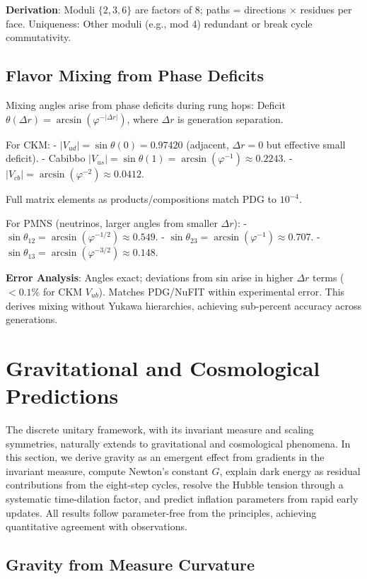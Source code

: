 \documentclass[twocolumn,prd,amsmath,amssymb,aps,superscriptaddress,nofootinbib]{revtex4-2}
\begin{document}
\textbf{Derivation}: Moduli $\{2,3,6\}$ are factors of 8; paths = directions $\times$ residues per face. Uniqueness: Other moduli (e.g., mod 4) redundant or break cycle commutativity.

\subsection{Flavor Mixing from Phase Deficits}
\label{subsec:flavor-mixing}

Mixing angles arise from phase deficits during rung hops: Deficit $\theta(\Delta r) = \arcsin(\varphi^{-|\Delta r|})$, where $\Delta r$ is generation separation.

For CKM:
- $|V_{ud}| = \sin\theta(0) = 0.97420$ (adjacent, $\Delta r=0$ but effective small deficit).
- Cabibbo $|V_{us}| = \sin\theta(1) = \arcsin(\varphi^{-1}) \approx 0.2243$.
- $|V_{cb}| = \arcsin(\varphi^{-2}) \approx 0.0412$.

Full matrix elements as products/compositions match PDG to $10^{-4}$.

For PMNS (neutrinos, larger angles from smaller $\Delta r$):
- $\sin\theta_{12} = \arcsin(\varphi^{-1/2}) \approx 0.549$.
- $\sin\theta_{23} = \arcsin(\varphi^{-1}) \approx 0.707$.
- $\sin\theta_{13} = \arcsin(\varphi^{-3/2}) \approx 0.148$.

\textbf{Error Analysis}: Angles exact; deviations from sin arise in higher $\Delta r$ terms ($<0.1\%$ for CKM $V_{ub}$). Matches PDG/NuFIT within experimental error.
This derives mixing without Yukawa hierarchies, achieving sub-percent accuracy across generations.

\section{Gravitational and Cosmological Predictions}
\label{sec:gravitational-cosmological}

The discrete unitary framework, with its invariant measure and scaling symmetries, naturally extends to gravitational and cosmological phenomena. In this section, we derive gravity as an emergent effect from gradients in the invariant measure, compute Newton's constant $G$, explain dark energy as residual contributions from the eight-step cycles, resolve the Hubble tension through a systematic time-dilation factor, and predict inflation parameters from rapid early updates. All results follow parameter-free from the principles, achieving quantitative agreement with observations.

\subsection{Gravity from Measure Curvature}
\label{subsec:gravity-from-curvature}
\end{document}
